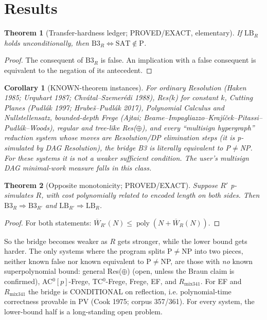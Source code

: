 \documentclass[11pt]{article}
\newtheorem{theorem}{Theorem}
\newtheorem{corollary}{Corollary}
\begin{document}
\section{Results}
\begin{theorem}[Transfer-hardness ledger; PROVED/EXACT, elementary]\label{t:ledger}
If $\mathrm{LB}_R$ holds unconditionally, then $\mathrm{B3}_R\Leftrightarrow\mathrm{SAT}\notin\mathrm P$.
\end{theorem}
\begin{proof}
The consequent of $\mathrm{B3}_R$ is false. An implication with a false consequent is
equivalent to the negation of its antecedent.
\end{proof}
\begin{corollary}[KNOWN-theorem instances]
For ordinary Resolution (Haken 1985; Urquhart 1987; Chvátal--Szemerédi 1988), Res($k$)
for constant $k$, Cutting Planes (Pudlák 1997; Hrubeš--Pudlák 2017), Polynomial Calculus
and Nullstellensatz, bounded-depth Frege (Ajtai; Beame--Impagliazzo--Krajíček--Pitassi--Pudlák--Woods),
regular and tree-like Res($\oplus$), and every ``multisign hypergraph'' reduction system whose
moves are Resolution/DP elimination steps (it is p-simulated by DAG Resolution),
the bridge B3 is \emph{literally equivalent to} P$\ne$NP. For these systems it is not a weaker
sufficient condition. The user's multisign DAG minimal-work measure falls in this class.
\end{corollary}
\begin{theorem}[Opposite monotonicity; PROVED/EXACT]\label{t:mono}
Suppose $R'$ p-simulates $R$, with cost polynomially related to encoded length on both sides.
Then $\mathrm{B3}_R\Rightarrow\mathrm{B3}_{R'}$ and $\mathrm{LB}_{R'}\Rightarrow\mathrm{LB}_R$.
\end{theorem}
\begin{proof}
For both statements: $\overline W_{R'}(N)\le\operatorname{poly}(N+\overline W_R(N))$.
\end{proof}
So the bridge becomes weaker as $R$ gets stronger, while the lower bound gets harder.
The only systems where the program splits P$\ne$NP into two pieces, neither known false
nor known equivalent to P$\ne$NP, are those with \emph{no} known superpolynomial bound:
general Res($\oplus$) (open, unless the Braun claim is confirmed), AC$^0[p]$-Frege, TC$^0$-Frege,
Frege, EF, and $R_{\mathrm{mix341}}$. For EF and $R_{\mathrm{mix341}}$ the bridge is
CONDITIONAL on reflection, i.e. polynomial-time correctness provable in PV (Cook 1975;
corpus 357/361). For every system, the lower-bound half is a long-standing open problem.
\end{document}
